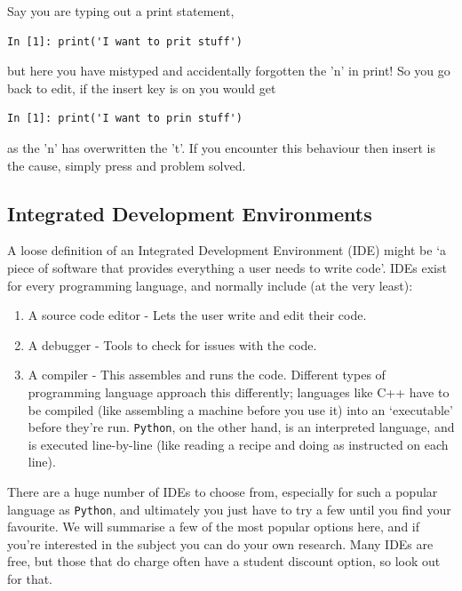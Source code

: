 Say you are typing out a print statement,
\begin{lstlisting}[style=PY]
In [1]: print('I want to prit stuff')
\end{lstlisting}
but here you have mistyped and accidentally forgotten the 'n' in print! So you go back to edit, if the insert key is on you would get 
\begin{lstlisting}[style=PY]
In [1]: print('I want to prin stuff')
\end{lstlisting}
as the 'n' has overwritten the 't'. If you encounter this behaviour then insert is the cause, simply press  and problem solved.


\begin{tcolorbox}[colback=red!5!white,colframe=red!75!black]
\section{Integrated Development Environments}
\label{softwareoptions}
A loose definition of an Integrated Development Environment (IDE) might be `a piece of software that provides everything a user needs to write code'. IDEs exist for every programming language, and normally include (at the very least):
\begin{enumerate}
    \item A source code editor - Lets the user write and edit their code.
    \item A debugger - Tools to check for issues with the code.
    \item A compiler - This assembles and runs the code. Different types of programming language approach this differently; languages like C++ have to be compiled (like assembling a machine before you use it) into an `executable' before they're run. \texttt{Python}, on the other hand, is an interpreted language, and is executed line-by-line (like reading a recipe and doing as instructed on each line).
\end{enumerate}

There are a huge number of IDEs to choose from, especially for such a popular language as \texttt{Python}, and ultimately you just have to try a few until you find your favourite. We will summarise a few of the most popular options here, and if you're interested in the subject you can do your own research. Many IDEs are free, but those that do charge often have a student discount option, so look out for that.\\


\end{tcolorbox}
